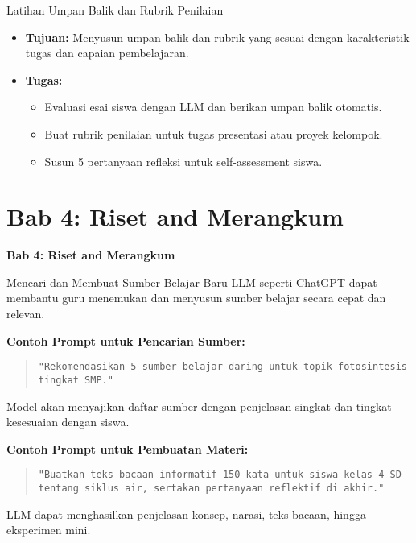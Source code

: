 \documentclass[aspectratio=169, table]{beamer}
\begin{document}
\begin{frame}[fragile]{Latihan Umpan Balik dan Rubrik Penilaian}
	\vspace{20pt}
	\small
	\begin{itemize}
		\item \textbf{Tujuan:} Menyusun umpan balik dan rubrik yang sesuai dengan karakteristik tugas dan capaian pembelajaran.
		
		\item \textbf{Tugas:}
		\begin{itemize}
			\item Evaluasi esai siswa dengan LLM dan berikan umpan balik otomatis.
			\item Buat rubrik penilaian untuk tugas presentasi atau proyek kelompok.
			\item Susun 5 pertanyaan refleksi untuk self-assessment siswa.
		\end{itemize}
	\end{itemize}
\end{frame}


\section{Bab 4: Riset and Merangkum}
\begin{frame}{\hfill}
	\centering
	\Huge{\textbf{Bab 4: Riset and Merangkum}}
\end{frame}

\begin{frame}[fragile]{Mencari dan Membuat Sumber Belajar Baru}
	\vspace{20pt}
	LLM seperti ChatGPT dapat membantu guru menemukan dan menyusun sumber belajar secara cepat dan relevan.
	
	\textbf{Contoh Prompt untuk Pencarian Sumber:}
	\begin{quote}
		\centering
		\texttt{"Rekomendasikan 5 sumber belajar daring untuk topik fotosintesis tingkat SMP."}
	\end{quote}
	Model akan menyajikan daftar sumber dengan penjelasan singkat dan tingkat kesesuaian dengan siswa.
	
	\textbf{Contoh Prompt untuk Pembuatan Materi:}
	\begin{quote}
		\centering
		\texttt{"Buatkan teks bacaan informatif 150 kata untuk siswa kelas 4 SD tentang siklus air, sertakan pertanyaan reflektif di akhir."}
	\end{quote}
	LLM dapat menghasilkan penjelasan konsep, narasi, teks bacaan, hingga eksperimen mini.
\end{frame}
\end{document}
